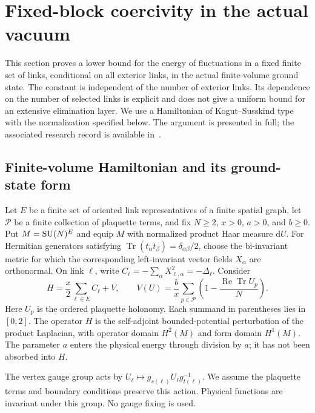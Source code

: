 \section{Fixed-block coercivity in the actual vacuum}
\label{vac:section}

This section proves a lower bound for the energy of fluctuations in a fixed
finite set of links, conditional on all exterior links, in the actual
finite-volume ground state.  The constant is independent of the number of
exterior links.  Its dependence on the number of selected links is explicit
and does not give a uniform bound for an extensive elimination layer.
We use a Hamiltonian of Kogut--Susskind type~\cite{KS} with the normalization
specified below.  The argument is presented in full; the associated research
record is available in~\cite{Archive}.

\subsection{Finite-volume Hamiltonian and its ground-state form}
\label{vac:setup}

Let $E$ be a finite set of oriented link representatives of a finite spatial
graph, let $\mathcal P$ be a finite collection of plaquette terms, and fix
$N\geq2$, $x>0$, $a>0$, and $b\geq0$.  Put
$M=\operatorname{SU}(N)^E$ and equip $M$ with normalized product Haar measure $\mathrm dU$.
For Hermitian generators satisfying
$\operatorname{Tr}(t_\alpha t_\beta)=\delta_{\alpha\beta}/2$, choose the
bi-invariant metric for which the corresponding left-invariant vector fields
$X_\alpha$ are orthonormal.  On link $\ell$, write
$C_\ell=-\sum_\alpha X_{\ell,\alpha}^2=-\Delta_\ell$.  Consider
\begin{equation}
 H=\frac{x}{2}\sum_{\ell\in E}C_\ell+V,
 \qquad
 V(U)=\frac b x\sum_{p\in\mathcal P}
       \left(1-\frac{\operatorname{Re}\operatorname{Tr}U_p}{N}\right).
 \label{vac:H}
\end{equation}
Here $U_p$ is the ordered plaquette holonomy.  Each summand in parentheses
lies in $[0,2]$.  The operator $H$ is the self-adjoint bounded-potential
perturbation of the product Laplacian, with operator domain $H^2(M)$ and
form domain $H^1(M)$.  The parameter $a$ enters the physical energy through
division by $a$; it has not been absorbed into $H$.

The vertex gauge group acts by
$U_\ell\mapsto g_{s(\ell)}U_\ell g_{t(\ell)}^{-1}$.  We assume the
plaquette terms and boundary conditions preserve this action.  Physical
functions are invariant under this group.  No gauge fixing is used.

